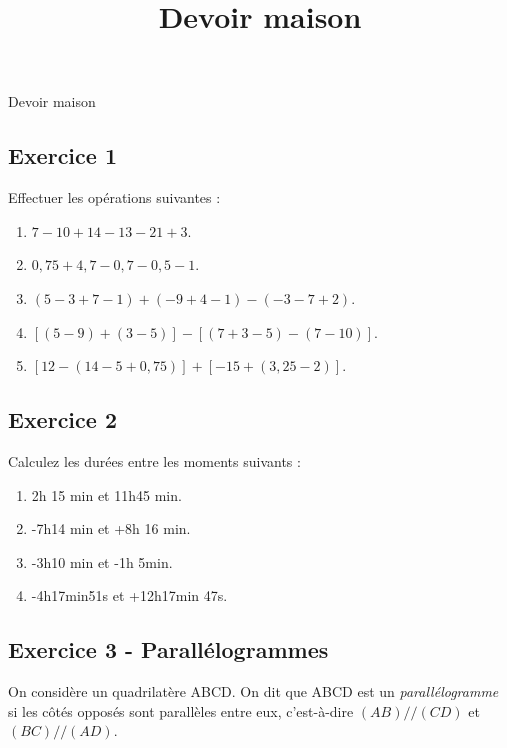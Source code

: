 \documentclass[12 pt]{extarticle}
\title{Devoir maison}
\date{}
\theoremstyle{plain}
\begin{document}
\begin{center}{\Large Devoir maison}\\ 
 \end{center}
 
 \subsection*{Exercice 1 }
 
 
 Effectuer les opérations suivantes : 
 \begin{enumerate}
 \item  $ 7 - 10 + 14 -13 - 21 +3$.
 \item $ 0,75 +4,7-0,7 -0,5 -1$. 
 \item $(5-3+7-1)+(-9+4-1)-(-3-7+2)$. 
 \item $[(5-9)+(3-5)]-[(7+3-5)-(7-10)]$. 
 \item $[12-(14-5+0,75)] + [-15 + (3,25-2)]$. 
 
  \end{enumerate}
 \subsection*{Exercice 2}
 
 Calculez les durées entre les moments suivants : 
 
\begin{enumerate}
\item 2h 15 min et 11h45 min. 
\item -7h14 min et +8h 16 min. 
\item -3h10 min et -1h 5min.
\item -4h17min51s et +12h17min 47s. 
\end{enumerate}

\subsection*{Exercice 3 - Parallélogrammes}
 
 On considère un quadrilatère ABCD. On dit que ABCD est un \emph{parallélogramme} si les côtés opposés sont parallèles entre eux, c'est-à-dire $(AB)//(CD)$ et $(BC)//(AD)$.
 
\end{document}
